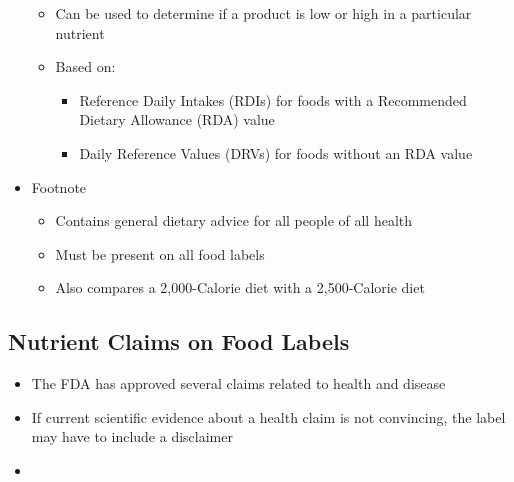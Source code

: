 \documentclass[title={Chapter 2}]{fdsn201notes}
\begin{document}
\begin{itemize}
\begin{itemize}
		\item Can be used to determine if a product is low or high in a particular nutrient
		\item Based on:
		\begin{itemize}
			\item Reference Daily Intakes (RDIs)\label{dfn:rdi} for foods with a Recommended Dietary Allowance (RDA)\label{dfn:rda} value
			\item Daily Reference Values (DRVs)\label{dfn:drv} for foods without an RDA value
		\end{itemize}
	\end{itemize}
	\item Footnote
	\begin{itemize}
		\item Contains general dietary advice for all people of all health
		\item Must be present on all food labels
		\item Also compares a 2,000-Calorie diet with a 2,500-Calorie diet
	\end{itemize}
\end{itemize}

\subsection{Nutrient Claims on Food Labels}\label{subsec:nutrient-claims-on-food-labels}
\begin{itemize}
	\item The FDA has approved several claims related to health and disease
	\item If current scientific evidence about a health claim is not convincing, the label may have to include a disclaimer
	\item {}
\end{itemize}
\end{document}

